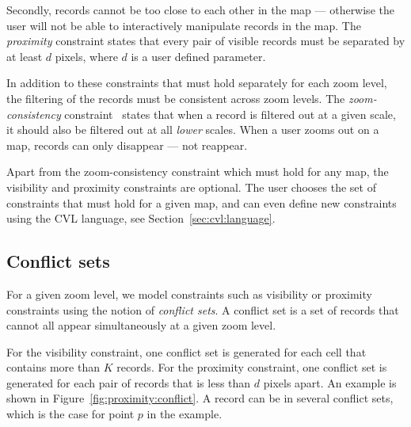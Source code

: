 Secondly, records cannot be too close to each other in the map --- otherwise the user will not be able to interactively manipulate records in the map. The \emph{proximity} constraint states that every pair of visible records must be separated by at least $d$ pixels, where $d$ is a user defined parameter.

In addition to these constraints that must hold separately for each zoom level, the filtering of the records must be consistent across zoom levels. The \emph{zoom-consistency} constraint~\cite{sarma2012fusiontables} states that when a record is filtered out at a given scale, it should also be filtered out at all \emph{lower} scales. When a user zooms out on a map, records can only disappear --- not reappear.

Apart from the zoom-consistency constraint which must hold for any map, the visibility and proximity constraints are optional. The user chooses the set of constraints that must hold for a given map, and can even define new constraints using the CVL language, see Section~\ref{sec:cvl:language}.

\subsection{Conflict sets}
\label{sec:conflicts}

For a given zoom level, we model constraints such as visibility or proximity constraints using the notion of \emph{conflict sets}. A conflict set is a set of records that cannot all appear simultaneously at a given zoom level. 

For the visibility constraint, one conflict set is generated for each cell that contains more than $K$ records. For the proximity constraint, one conflict set is generated for each pair of records that is less than $d$ pixels apart. An example is shown in Figure~\ref{fig:proximity:conflict}. A record can be in several conflict sets, which is the case for point $p$ in the example.

